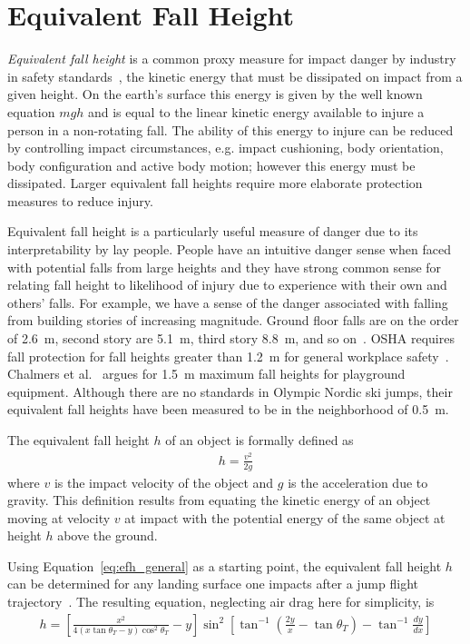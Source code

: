 \documentclass{article}
\begin{document}
\section{Equivalent Fall Height}
%
\emph{Equivalent fall height} is a common proxy measure for impact danger by
industry in safety standards~\cite{Hubbard2012}, the kinetic energy that must
be dissipated on impact from a given height. On the earth's surface this energy
is given by the well known equation $mgh$ and is equal to the linear kinetic
energy available to injure a person in a non-rotating fall. The ability of this
energy to injure can be reduced by controlling impact circumstances, e.g.
impact cushioning, body orientation, body configuration and active body motion;
however this energy must be dissipated. Larger equivalent fall heights require
more elaborate protection measures to reduce injury.

Equivalent fall height is a particularly useful measure of danger due to its
interpretability by lay people. People have an intuitive danger sense when
faced with potential falls from large heights and they have strong common sense
for relating fall height to likelihood of injury due to experience with their
own and others' falls. For example, we have a sense of the danger associated
with falling from building stories of increasing magnitude. Ground floor falls
are on the order of 2.6~\si{\meter}, second story are 5.1~\si{\meter}, third
story 8.8~\si{\meter}, and so on~\cite{Vish2005}. OSHA requires fall protection
for fall heights greater than 1.2~\si{\meter} for general workplace
safety~\cite{OSHA2021}. Chalmers et al.~\cite{Chalmers1996} argues for
1.5~\si{\meter} maximum fall heights for playground equipment. Although there
are no standards in Olympic Nordic ski jumps, their equivalent fall heights
have been measured to be in the neighborhood of 0.5~\si{\meter}.

The equivalent fall height $h$ of an object is formally defined as
%
\begin{align} h = \frac{v^2}{2g} \label{eq:efh_general} \end{align}
%
where $v$ is the impact velocity of the object and $g$ is the acceleration due
to gravity. This definition results from equating the kinetic energy of an
object moving at velocity $v$ at impact with the potential energy of the same
object at height $h$ above the ground.

Using Equation~\ref{eq:efh_general} as a starting point, the equivalent fall
height $h$ can be determined for any landing surface one impacts after a jump
flight trajectory~\cite{Petrone2017}. The resulting equation, neglecting air
drag here for simplicity, is
%
\begin{align}
  h = \left[\frac{x^2}{4(x\tan\theta_T - y)\cos^{2}\theta_T} -
    y\right]\sin^{2}\left[\tan^{-1}\left(\frac{2y}{x}- \tan\theta_T\right) -
    \tan^{-1}\frac{dy}{dx}\right]
  \label{eq:efh}
\end{align}
\end{document}
